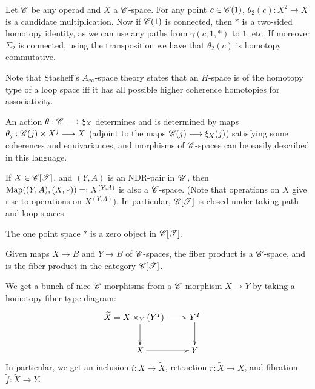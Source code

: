 \documentclass[11pt]{article}
\begin{document}
Let $\mathscr{C}$ be any operad and $X$ a $\mathscr{C}$-space. For any point
$c\in\mathscr{C}(1)$, $\theta_2(c):X^2\to X$ is a candidate multiplication.
Now if $\mathscr{C}(1)$ is connected, then $*$ is a two-sided homotopy identity, as
we can use any paths from $\gamma(c;1,*)$ to $1$, etc.
If moreover $\Sigma_2$ is connected, using the transposition we have that
$\theta_2(c)$ is homotopy commutative.

Note that Stasheff's $A_\infty$-space theory states that an $H$-space is of
the homotopy type of a loop space iff it has all possible higher coherence
homotopies for associativity.
\begin{lem*}[1.4]
An action $\theta:\mathscr{C}\longrightarrow\xi_X$ determines and is determined by maps 
$\theta_j:\mathscr{C}(j)\times X^j\longrightarrow X$ (adjoint to the maps $\mathscr{C}(j)\longrightarrow\xi_X(j)$)
satisfying some coherences and equivariances, and morphisms of $\mathscr{C}$-spaces 
can be easily described in this language.
\end{lem*}
\begin{lem*}[1.5]
If $X\in\mathscr{C}[\mathscr{T}]$, and $(Y,A)$ is an NDR-pair in $\mathscr{U}$, then 
$\operatorname{Map}((Y,A),(X,*))=:X^{(Y,A)}$ is also a $\mathscr{C}$-space. (Note that operations
on $X$ give rise to operations on $X^{(Y,A)}$). In particular, $\mathscr{C}[\mathscr{T}]$ is
closed under taking path and loop spaces.
\end{lem*}
\begin{lem*}[1.6]
The one point space $*$ is a zero object in $\mathscr{C}[\mathscr{T}]$.
\end{lem*}
\begin{lem*}[1.7]
Given maps $X\to B$ and $Y\to B$ of $\mathscr{C}$-spaces, the fiber product is a 
$\mathscr{C}$-space, and is the fiber product in the category $\mathscr{C}[\mathscr{T}]$.
\end{lem*}
\begin{lem*}[1.8] We get a bunch of nice $\mathscr{C}$-morphisms from a $\mathscr{C}$-morphism
$X\to Y$ by taking a homotopy fiber-type diagram:
\[\xymatrix{
\makebox[2cm][r]{$\widetilde X=X\times_Y(Y^I)$}\ar[r]\ar[d]&Y^I\ar[d]\\
X\ar[r]&Y
}\]
In particular, we get an inclusion $i:X\to \widetilde X$,
retraction $r:\widetilde X\to X$, and fibration 
$\widetilde f:\widetilde X\to Y$.
\end{lem*}
\end{document}

